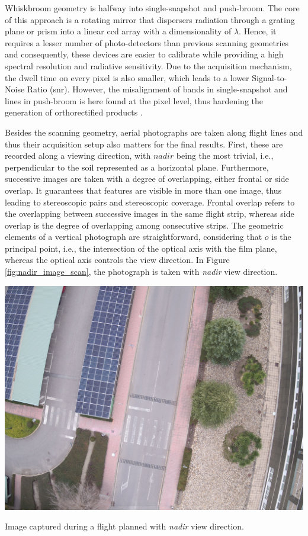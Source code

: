Whiskbroom geometry is halfway into single-snapshot and push-broom. The core of this approach is a rotating mirror that dispersers radiation through a grating plane or prism into a linear \acrshort{ccd} array with a dimensionality of $\lambda$. Hence, it requires a lesser number of photo-detectors than previous scanning geometries and consequently, these devices are easier to calibrate while providing a high spectral resolution and radiative sensitivity. Due to the acquisition mechanism, the dwell time on every pixel is also smaller, which leads to a lower Signal-to-Noise Ratio (\acrshort{snr}). However, the misalignment of bands in single-snapshot and lines in push-broom is here found at the pixel level, thus hardening the generation of orthorectified products \cite{pu_hyperspectral_2017}.

Besides the scanning geometry, aerial photographs are taken along flight lines and thus their acquisition setup also matters for the final results. First, these are recorded along a viewing direction, with $\textit{nadir}$ being the most trivial, i.e., perpendicular to the soil represented as a horizontal plane. Furthermore, successive images are taken with a degree of overlapping, either frontal or side overlap. It guarantees that features are visible in more than one image, thus leading to stereoscopic pairs and stereoscopic coverage. Frontal overlap refers to the overlapping between successive images in the same flight strip, whereas side overlap is the degree of overlapping among consecutive strips. The geometric elements of a vertical photograph are straightforward, considering that $o$ is the principal point, i.e., the intersection of the optical axis with the film plane, whereas the optical axis controls the view direction. In Figure \ref{fig:nadir_image_scan}, the photograph is taken with \textit{nadir} view direction.
\begin{marginfigure}[-5cm]
    \centering
    \includegraphics{figs/fundamentals/nadir_image_scan.jpg}
    \caption{Image captured during a flight planned with \textit{nadir} view direction.}
    \label{fig:nadir_image_scan}
\end{marginfigure}

